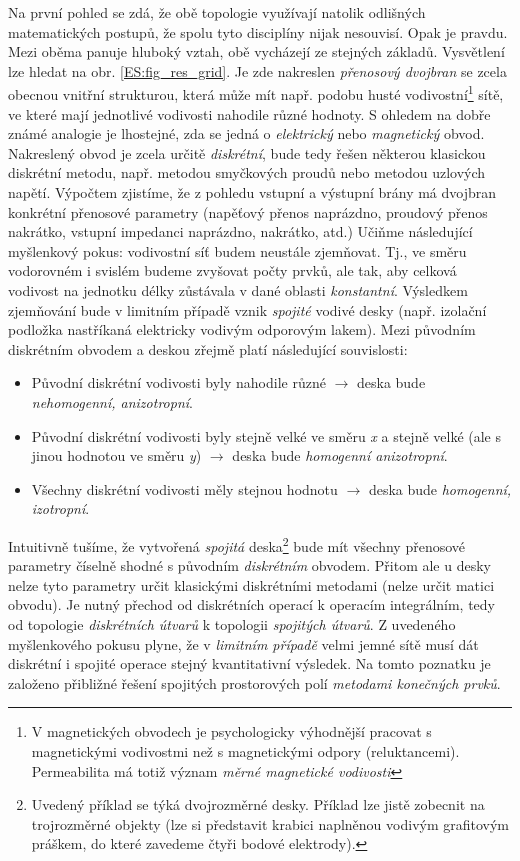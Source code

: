   Na první pohled se zdá, že obě topologie využívají natolik odlišných matematických postupů, že
  spolu tyto disciplíny nijak nesouvisí. Opak je pravdu. Mezi oběma panuje hluboký vztah, obě
  vycházejí ze stejných základů. Vysvětlení lze hledat na obr. \ref{ES:fig_res_grid}. Je zde
  nakreslen \emph{přenosový dvojbran} se zcela obecnou vnitřní strukturou, která může mít např.
  podobu husté vodivostní\footnote{V magnetických obvodech je psychologicky výhodnější pracovat s
  magnetickými vodivostmi než s magnetickými odpory (reluktancemi). Permeabilita má totiž význam
  \emph{měrné magnetické vodivosti}} sítě, ve které mají jednotlivé vodivosti nahodile různé
  hodnoty. S ohledem na dobře známé analogie je lhostejné, zda se jedná o \emph{elektrický} nebo
  \emph{magnetický} obvod. Nakreslený obvod je zcela určitě \emph{diskrétní}, bude tedy řešen
  některou klasickou diskrétní metodu, např. metodou smyčkových proudů nebo metodou uzlových
  napětí. Výpočtem zjistíme, že z pohledu vstupní a výstupní brány má dvojbran konkrétní přenosové
  parametry (napěťový přenos naprázdno, proudový přenos nakrátko, vstupní impedanci naprázdno,
  nakrátko, atd.) Učiňme následující myšlenkový pokus: vodivostní síť budem neustále zjemňovat.
  Tj., ve směru vodorovném i svislém budeme zvyšovat počty prvků, ale tak, aby celková vodivost na
  jednotku délky zůstávala v dané oblasti \emph{konstantní}. Výsledkem zjemňování bude v limitním
  případě vznik \emph{spojité} vodivé desky (např. izolační podložka nastříkaná elektricky vodivým
  odporovým lakem). Mezi původním diskrétním obvodem a deskou zřejmě platí následující souvislosti:
  \begin{itemize}\addtolength{\itemsep}{-0.5\baselineskip}
    \item Původní diskrétní vodivosti byly nahodile různé \(\longrightarrow\) deska bude
          \emph{nehomogenní, anizotropní}.
    \item Původní diskrétní vodivosti byly stejně velké ve směru \emph{x} a stejně velké (ale s
          jinou hodnotou ve směru \emph{y}) \(\longrightarrow\) deska bude \emph{homogenní
          anizotropní}.
    \item Všechny diskrétní vodivosti měly stejnou hodnotu \(\longrightarrow\) deska bude
          \emph{homogenní, izotropní}.
  \end{itemize}
  
  Intuitivně tušíme, že vytvořená \emph{spojitá} deska\footnote{Uvedený příklad se týká
  dvojrozměrné desky. Příklad lze jistě zobecnit na trojrozměrné objekty (lze si představit
  krabici naplněnou vodivým grafitovým práškem, do které zavedeme čtyři bodové elektrody).} bude mít
  všechny přenosové parametry číselně shodné s původním \emph{diskrétním} obvodem. Přitom ale u
  desky nelze tyto parametry určit klasickými diskrétními metodami (nelze určit matici obvodu). Je
  nutný přechod od diskrétních operací k operacím integrálním, tedy od topologie \emph{diskrétních
  útvarů} k topologii \emph{spojitých útvarů}. Z uvedeného myšlenkového pokusu plyne, že v
  \emph{limitním případě} velmi jemné sítě musí dát diskrétní i spojité operace stejný kvantitativní
  výsledek. Na tomto poznatku je založeno přibližné řešení spojitých prostorových polí
  \emph{metodami konečných prvků}.
  
